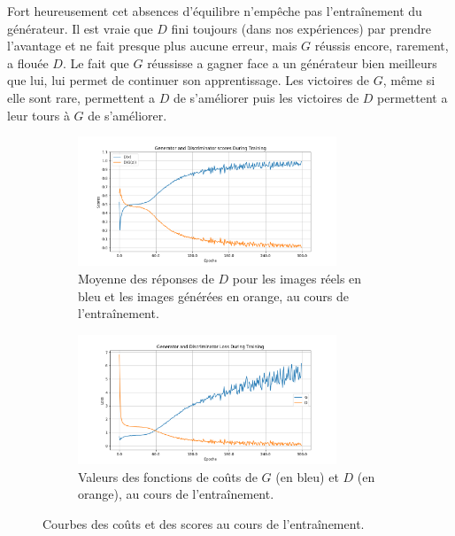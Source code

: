 \documentclass[11pt,francais]{article}
\begin{document}
Fort heureusement cet absences d'équilibre n'empêche pas l'entraînement du générateur. Il est vraie que \(D\) fini toujours (dans nos expériences) par prendre l'avantage et ne fait presque plus aucune erreur, mais \(G\) réussis encore, rarement, a flouée \(D\). Le fait que \(G\) réussisse a gagner face a un générateur bien meilleurs que lui, lui permet de continuer son apprentissage. Les victoires de \(G\), même si elle sont rare, permettent a \(D\) de s'améliorer puis les victoires de \(D\) permettent a leur tours à \(G\) de s'améliorer. \\
\newpage
\begin{figure}[!h]
 \centering
    \begin{subfigure}[b]{\textwidth}
        \includegraphics[width=0.85\textwidth]{Figures/LossG_et_Convergeance/scores300-64.png}
        \caption{Moyenne des réponses de \(D\) pour les images réels en bleu et les images générées en orange, au cours de l'entraînement.}
        \label{fig:fig5}
    \end{subfigure}
    \begin{subfigure}[b]{\textwidth}
        \includegraphics[width=0.85\textwidth]{Figures/LossG_et_Convergeance/losses300-64.png}
        \caption{Valeurs des fonctions de coûts de \(G\) (en bleu) et \(D\) (en orange), au cours de l'entraînement.}
        \label{fig:fig6}
    \end{subfigure}
    \caption{Courbes des coûts et des scores au cours de l'entraînement.}
\end{figure}
\end{document}
